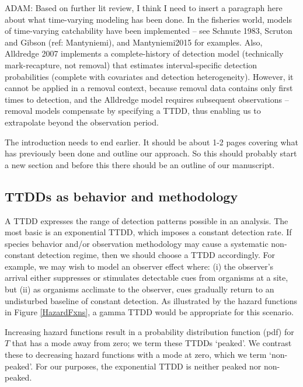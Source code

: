 \documentclass[useAMS,usenatbib,referee,12pt]{article}
\newcommand{\adam}[1]{{\color{blue} ADAM: #1}}
\newcommand{\jarad}[1]{{\color{red} #1}}
\begin{document}
\adam{Based on further lit review, I think I need to insert a paragraph here about what time-varying modeling has been done.  In the fisheries world, models of time-varying catchability have been implemented -- see Schnute 1983, Scruton and Gibson (ref: Mantyniemi), and Mantyniemi2015 for examples.  Also, Alldredge 2007 implements a complete-history of detection model (technically mark-recapture, not removal) that estimates interval-specific detection probabilities (complete with covariates and detection heterogeneity).  However, it cannot be applied in a removal context, because removal data contains only first times to detection, and the Alldredge model requires subsequent observations -- removal models compensate by specifying a TTDD, thus enabling us to extrapolate beyond the observation period.}  

\jarad{The introduction needs to end earlier. It should be about 1-2 pages covering what has previously been done and outline our approach. So this should probably start a new section and before this there should be an outline of our manuscript. }

\subsection{TTDDs as behavior and methodology}

A TTDD expresses the range of detection patterns possible in an analysis.  The most basic is an exponential TTDD, which imposes a constant detection rate.  If species behavior and/or observation methodology may cause a systematic non-constant detection regime, then we should choose a TTDD accordingly.  For example, we may wish to model an observer effect where: (i) the observer's arrival either suppresses or stimulates detectable cues from organisms at a site, but (ii) as organisms acclimate to the observer, cues gradually return to an undisturbed baseline of constant detection.  As illustrated by the hazard functions in Figure \ref{HazardFxns}, a gamma TTDD would be appropriate for this scenario.

Increasing hazard functions result in a probability distribution function (pdf) for $T$ that has a mode away from zero; we term these TTDDs `peaked'.  We contrast these to decreasing hazard functions with a mode at zero, which we term `non-peaked'.  For our purposes, the exponential TTDD is neither peaked nor non-peaked.
\end{document}
